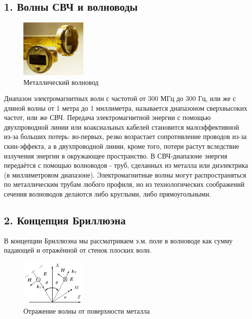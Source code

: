 \documentclass[a4paper,12pt]{article}
\begin{document}
\subsection*{1. Волны СВЧ и волноводы}
\begin{figure}
  \begin{center}
    \includegraphics[width=0.29\textwidth]{images/waveguide.jpg}
  \end{center}
  \caption{Металлический волновод}
\end{figure}
Диапазон электромагнитных волн с частотой от 300 МГц до 300 Гц, или же с длиной волны от 1 метра до 1 миллиметра, называется диапазоном сверхвысоких частот, или же СВЧ. Передача электромагнитной энергии с помощью двухпроводной линии или коаксиальных кабелей становится малоэффективной из-за больших потерь: во-первых, резко возрастает сопротивление проводов из-за скин-эффекта, а в двухпроводной линии, кроме того, потери растут вследствие излучения энергии в окружающее пространство.
В СВЧ-диапазоне энергия передаётся с помощью волноводов - труб, сделанных из металла или диэлектрика (в миллиметровом диапазоне). Электромагнитные волны могут распространяться по металлическим трубам любого профиля, но из технологических соображений сечения волноводов делаются либо круглыми, либо прямоугольными.

\subsection*{2. Концепция Бриллюэна}

В концепции Бриллюэна мы рассматриваем э.м. поле в волноводе как сумму падающей и отражённой от стенок плоских волн.

\begin{figure}
  \begin{center}
    \includegraphics[width=0.29\textwidth]{images/reflection.jpg}
  \end{center}
  \caption{Отражение волны от поверхности металла}
\end{figure}
\end{document}
